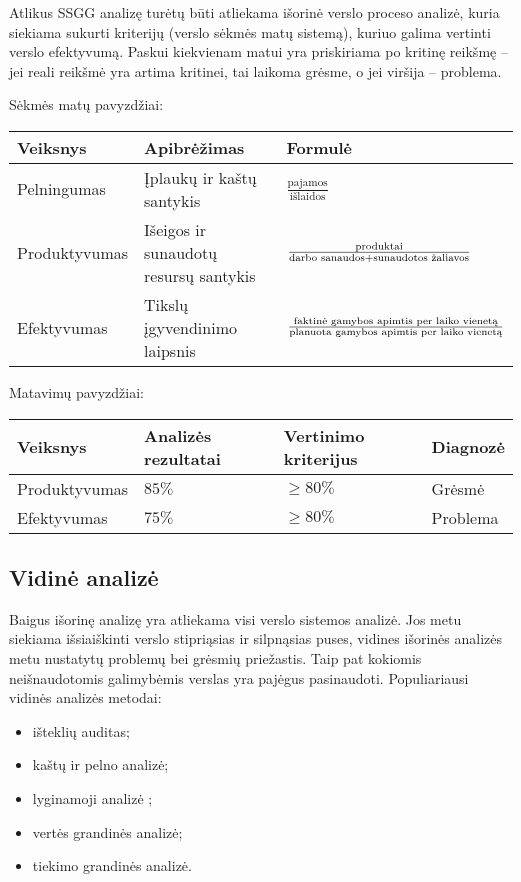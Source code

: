 Atlikus SSGG analizę turėtų būti atliekama išorinė verslo proceso
analizė, kuria siekiama sukurti kriterijų (verslo sėkmės matų sistemą), 
kuriuo galima vertinti verslo efektyvumą. Paskui kiekvienam matui
yra priskiriama po kritinę reikšmę – jei reali reikšmė yra artima kritinei,
tai laikoma grėsme, o jei viršija – problema.
\begin{exmp}
  Sėkmės matų pavyzdžiai:

  \begin{tabularx}{\textwidth}{l|X|X}
    Veiksnys & Apibrėžimas & Formulė \\
    \hline
    Pelningumas & Įplaukų ir kaštų santykis & 
      $\frac{\text{pajamos}}{\text{išlaidos}}$ \\
    Produktyvumas & Išeigos ir sunaudotų resursų santykis &
      $\frac{\text{produktai}}{%
      \text{darbo sanaudos} + \text{sunaudotos žaliavos}}$ \\
    Efektyvumas & Tikslų įgyvendinimo laipsnis &
      $\frac{\text{faktinė gamybos apimtis per laiko vienetą}}{%
      \text{planuota gamybos apimtis per laiko vienetą}}$
  \end{tabularx}

  Matavimų pavyzdžiai:

  \begin{tabularx}{\textwidth}{l|X|X|X}
    Veiksnys & Analizės rezultatai & Vertinimo kriterijus & Diagnozė \\
    \hline
    Produktyvumas & $85 \%$ & $\geq 80 \%$ & Grėsmė \\
    Efektyvumas & $75 \%$ & $\geq 80 \%$ & Problema \\
  \end{tabularx}
\end{exmp}

\subsection{Vidinė analizė}

Baigus išorinę analizę yra atliekama visi verslo sistemos analizė. Jos
metu siekiama išsiaiškinti verslo stipriąsias ir silpnąsias puses,
vidines išorinės analizės metu nustatytų problemų bei grėsmių priežastis.
Taip pat kokiomis neišnaudotomis galimybėmis verslas yra pajėgus 
pasinaudoti. Populiariausi vidinės analizės metodai:
\begin{itemize}
  \item išteklių auditas;
  \item kaštų ir pelno analizė;
  \item lyginamoji analizė ;
  \item vertės grandinės analizė;
  \item tiekimo grandinės analizė.
\end{itemize}

